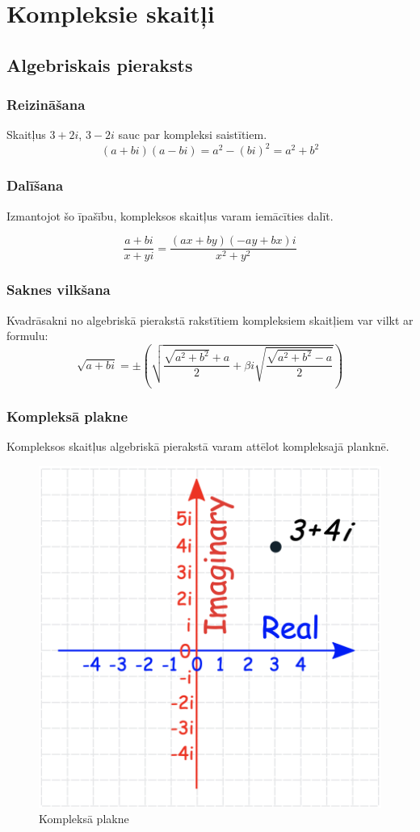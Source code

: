 \documentclass{article}
\begin{document}
\section{Kompleksie skaitļi}

\subsection{Algebriskais pieraksts}

\subsubsection{Reizināšana}

Skaitļus $3+2i$, $3-2i$ sauc par kompleksi saistītiem.
\begin{equation}
	(a+bi)(a-bi)=a^2-(bi)^2=a^2+b^2
\end{equation}

\subsubsection{Dalīšana}

Izmantojot šo īpašību, kompleksos skaitļus varam iemācīties dalīt.

\begin{equation}
	\frac{a+bi}{x+yi}
	= \frac{(ax+by)(-ay+bx)i}{x^2+y^2}
\end{equation}

\subsubsection{Saknes vilkšana}

Kvadrāsakni no algebriskā pierakstā rakstītiem kompleksiem skaitļiem var vilkt ar formulu:
\begin{equation}
	\sqrt{a+bi}=\pm
	\left(
	\sqrt{\frac{\sqrt{a^2+b^2}+a}{2}+\beta i\sqrt{\frac{\sqrt{a^2+b^2}-a}{2}}}
	\right)
\end{equation}

\subsubsection{Kompleksā plakne}

Kompleksos skaitļus algebriskā pierakstā varam attēlot kompleksajā planknē.

\begin{figure}[!htb]
	\centering
	\caption{Kompleksā plakne}
	\includegraphics[width=.3\linewidth]{complex_plane-1}
\end{figure}
\end{document}
